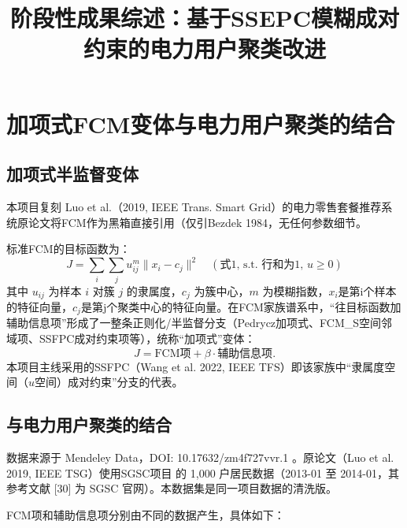 \documentclass[11pt,a4paper]{ctexart}
\title{阶段性成果综述：基于SSEPC模糊成对约束的电力用户聚类改进}
\begin{document}
	
	\maketitle
	
	
	\tableofcontents
	\newpage
	
	\section{加项式FCM变体与电力用户聚类的结合}
	
	\subsection{加项式半监督变体}
	
	本项目复刻 Luo et al.（2019, IEEE Trans. Smart Grid）的电力零售套餐推荐系统原论文将FCM作为黑箱直接引用（仅引Bezdek 1984，无任何参数细节。
	
	标准FCM的目标函数为：
	\begin{equation}
		J = \sum_{i}\sum_{j} u_{ij}^{m}\|x_{i} - c_{j}\|^{2}
		\quad (\text{式1, s.t. 行和为1, } u \ge 0)
	\end{equation}
	其中 $u_{ij}$ 为样本 $i$ 对簇 $j$ 的隶属度，$c_j$ 为簇中心，$m$ 为模糊指数，$x_i$是第i个样本的特征向量，$c_j$是第j个聚类中心的特征向量。在FCM家族谱系中，“往目标函数加辅助信息项”形成了一整条正则化/半监督分支（Pedrycz加项式、FCM\_S空间邻域项、SSFPC成对约束项等），统称“加项式”变体：
	\[
	J = \text{FCM项} + \beta \cdot \text{辅助信息项}.
	\]
	本项目主线采用的SSFPC（Wang et al. 2022, IEEE TFS）即该家族中“隶属度空间（$u$空间）成对约束”分支的代表。
	
	\subsection{与电力用户聚类的结合}
	
	数据来源于 Mendeley Data，DOI: 10.17632/zm4f727vvr.1 。原论文（Luo et al. 2019, IEEE TSG）使用SGSC项目 的 1,000 户居民数据（2013-01 至 2014-01，其参考文献 [30] 为 SGSC 官网）。本数据集是同一项目数据的清洗版。
	
		FCM项和辅助信息项分别由不同的数据产生，具体如下：
	
\end{document}
